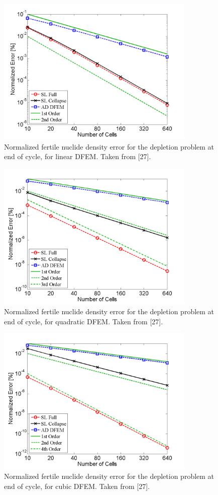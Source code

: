 \begin{figure}[!htp]
\centering
\includegraphics[width=9.5cm]{chapter5_depletion/ft_P1_norm_err.png}
\caption{Normalized fertile nuclide density error for the depletion problem at end of cycle, for linear DFEM.  Taken from [27].}
\label{fig:depletion_NFT_p1}
\end{figure}
%
\begin{figure}[!hbp]
\centering
\includegraphics[width=9.5cm]{chapter5_depletion/ft_P2_norm_err.png}
\caption{Normalized fertile nuclide density error for the depletion problem at end of cycle, for quadratic DFEM. Taken from [27].}
\label{fig:depletion_NFT_p2}
\end{figure}
%
\newpage
%
\begin{figure}[!htp]
\centering
\includegraphics[width=9.5cm]{chapter5_depletion/ft_P3_norm_err.png}
\caption{Normalized fertile nuclide density error for the depletion problem at end of cycle, for cubic DFEM.  Taken from [27].}
\label{fig:depletion_NFT_p3}
\end{figure}


